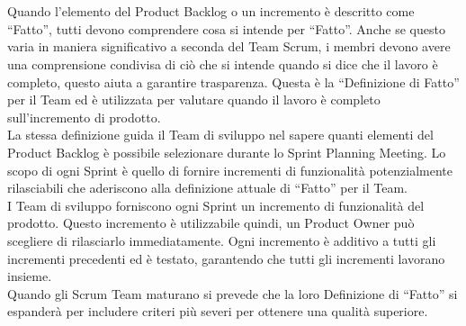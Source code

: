 
\section*{\color{Blue}{Definizione di ``Fatto''}}%
\label{sec:definition_of_done}
Quando l'elemento del Product Backlog o un incremento \`e descritto come ``Fatto'', tutti devono comprendere cosa si intende per 
``Fatto''.  Anche se questo varia in maniera significativo a seconda del Team Scrum, i membri devono avere una comprensione 
condivisa di ci\`o che si intende quando si dice che il lavoro \`e completo, questo aiuta a garantire trasparenza. Questa \`e la 
``Definizione di Fatto'' per il Team ed \`e utilizzata per valutare quando il lavoro \`e completo sull'incremento di prodotto. \newline
\\La stessa definizione guida il Team di sviluppo nel sapere quanti elementi del Product Backlog \`e possibile selezionare 
durante lo Sprint Planning Meeting. Lo scopo di ogni Sprint \`e quello di fornire incrementi di funzionalit\`a potenzialmente 
rilasciabili che aderiscono alla definizione attuale di ``Fatto'' per il Team. \newline
\\I Team di sviluppo forniscono ogni Sprint un incremento di funzionalit\`a del prodotto. Questo incremento \`e utilizzabile  
quindi, un Product Owner pu\`o scegliere di rilasciarlo immediatamente. Ogni incremento \`e additivo a tutti gli incrementi 
precedenti ed \`e testato, garantendo che tutti gli incrementi lavorano insieme. \newline
\\Quando gli Scrum Team maturano si prevede che la loro Definizione di ``Fatto'' si espander\`a per includere criteri pi\`u 
severi per ottenere una qualit\`a superiore.

